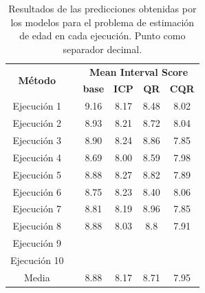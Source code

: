 \renewcommand{\arraystretch}{1.5}
\begin{table}[h]
    \small \centering
    \begin{tabular}{cccccc}
    \toprule
    \multirow{2}{*}{\textbf{Método}} &  & \multicolumn{4}{c}{\textbf{Mean Interval Score}}          \\ \cline{3-6} 
                                     &  & \textbf{base}  & \textbf{ICP}  & \textbf{QR}   & \textbf{CQR} \\ \cline{1-1} \cline{3-6} 
    Ejecución 1                      &  & 9.16           & 8.17          & 8.48          & 8.02         \\
    Ejecución 2                      &  & 8.93           & 8.21          & 8.72          & 8.04         \\
    Ejecución 3                      &  & 8.90           & 8.24          & 8.86          & 7.85         \\
    Ejecución 4                      &  & 8.69           & 8.00          & 8.59          & 7.98         \\
    Ejecución 5                      &  & 8.88           & 8.27          & 8.82          & 7.89         \\
    Ejecución 6                      &  & 8.75           & 8.23          & 8.40          & 8.06         \\
    Ejecución 7                      &  & 8.81           & 8.19          & 8.96          & 7.85         \\
    Ejecución 8                      &  & 8.88           & 8.03          & 8.8           & 7.91         \\
    Ejecución 9                      &  &                &               &               &              \\
    Ejecución 10                     &  &                &               &               &              \\ \cline{1-1} \cline{3-6} 
    Media                            &  & 8.88           & 8.17          & 8.71          & 7.95         \\ 
    \bottomrule
    \end{tabular}
    \caption[
        Resultados de las predicciones obtenidas por los modelos para el problema de estimación de edad en cada ejecución.
    ]{   
        Resultados de las predicciones obtenidas por los modelos para el problema de estimación de edad en cada ejecución.
        Punto como separador decimal.
    }
    \label{tab:AE_MIS_comparative}
\end{table}

